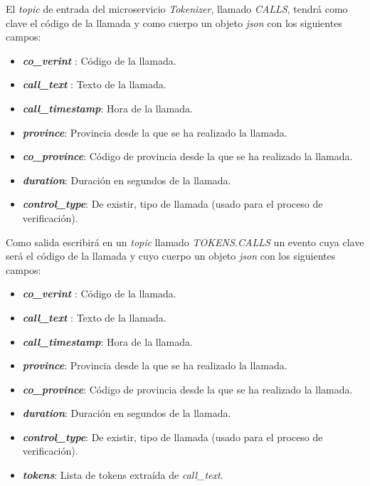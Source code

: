 El \textit{topic} de entrada del microservicio  \textit{Tokenizer}, llamado \textit{CALLS}, tendrá como clave el código de la llamada y como cuerpo un objeto \textit{json} con los siguientes campos:

\begin{itemize}
		\item \textbf{\textit{co\_verint}} : Código de la llamada. 
		\item  \textbf{\textit{call\_text}} : Texto de la llamada. 
		\item  \textbf{\textit{call\_timestamp}}: Hora de la llamada.
        \item \textbf{\textit{province}}: Provincia desde la que se ha realizado la llamada. 
        \item \textbf{\textit{co\_province}}: Código de provincia desde la que se ha realizado la llamada. 
        \item \textbf{\textit{duration}}: Duración en segundos de la llamada. 
        \item \textbf{\textit{control\_type}}: De existir, tipo de llamada (usado para el proceso de verificación). 
\end{itemize} 

Como salida escribirá en un \textit{topic}  llamado \textit{TOKENS.CALLS} un evento cuya clave será el código de la llamada y cuyo cuerpo un objeto \textit{json} con los siguientes campos:

\begin{itemize}
		\item \textbf{\textit{co\_verint}} : Código de la llamada. 
		\item  \textbf{\textit{call\_text}} : Texto de la llamada. 
		\item  \textbf{\textit{call\_timestamp}}: Hora de la llamada.
        \item \textbf{\textit{province}}: Provincia desde la que se ha realizado la llamada. 
        \item \textbf{\textit{co\_province}}: Código de provincia desde la que se ha realizado la llamada. 
        \item \textbf{\textit{duration}}: Duración en segundos de la llamada. 
        \item \textbf{\textit{control\_type}}: De existir, tipo de llamada (usado para el proceso de verificación).  
        \item \textbf{\textit{tokens}}: Lista de tokens extraída de \textit{call\_text}. 
\end{itemize} 



